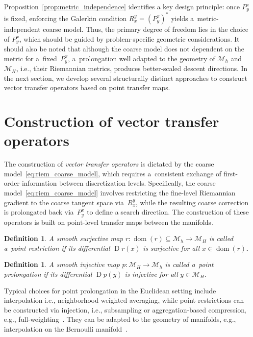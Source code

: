 \documentclass[11pt,reqno]{amsart}
\theoremstyle{plain}
\newtheorem{defn}[thm]{Definition}
\DeclareMathOperator{\Drm}{D}
\DeclareMathOperator{\dom}{dom}
\def\restr{r}
\def\prol{p}
\newcommand{\M}{\mathcal{M}}
\begin{document}
	Proposition~\ref{prop:metric_independence} identifies a key design principle: once $P^x_y$ is fixed, enforcing the Galerkin condition $R^y_x = (P^x_y)^\ast$ yields a~metric-independent coarse model. Thus, the primary degree of freedom lies in the choice of $P^x_y$, which should be guided by problem-specific geometric considerations. It should also be noted that although the coarse model does not dependent on the metric for a~fixed~$P^x_y$, a~prolongation well adapted to the geometry of $\M_h$ and $\M_H$, i.e., their Riemannian metrics, produces better-scaled descent directions.
	In the next section, we develop several structurally distinct approaches to construct vector transfer operators based on point transfer maps.
	
	
	\section{Construction of vector transfer operators}
	\label{sec:vector_transport_choice}
	
	The construction of \emph{vector transfer operators} is dictated by the coarse model~\eqref{eq:riem_coarse_model}, which requires a~consistent exchange of first-order information between discretization levels. Specifically, the coarse model~\eqref{eq:riem_coarse_model} involves restricting the fine-level Riemannian gradient to the coarse tangent space via~$R_x^y$, while the resulting coarse correction is prolongated back via~$P_y^x$ to define a search direction. The construction of these operators is built on point-level transfer maps between the manifolds.
	
	\begin{defn}
		{\em  A smooth surjective map $\restr : \dom(\restr)\subseteq \M_h \to \M_H$ is called a~\emph{point restriction} if its differential $\Drm \restr(x)$ is surjective for all $x\in \dom(\restr)$.}
	\end{defn}
	
	\begin{defn}
		{\em A smooth injective map $\prol : \M_H \to \M_h$ is called a~\emph{point prolongation} if its differential $\Drm \prol(y)$ is injective for all $y \in \M_H$.}
	\end{defn}
	
	Typical choices for point prolongation in the Euclidean setting include interpolation
	i.e., neighborhood-weighted averaging, while point restrictions can be constructed via injection, i.e., subsampling or aggregation-based compression, e.g., full-weighting~\textup{\cite{BriHM00}}. They can be adapted to the geometry of manifolds, e.g., interpolation on the Bernoulli manifold~\textup{\cite{MuePZ23}}.
	
\end{document}
